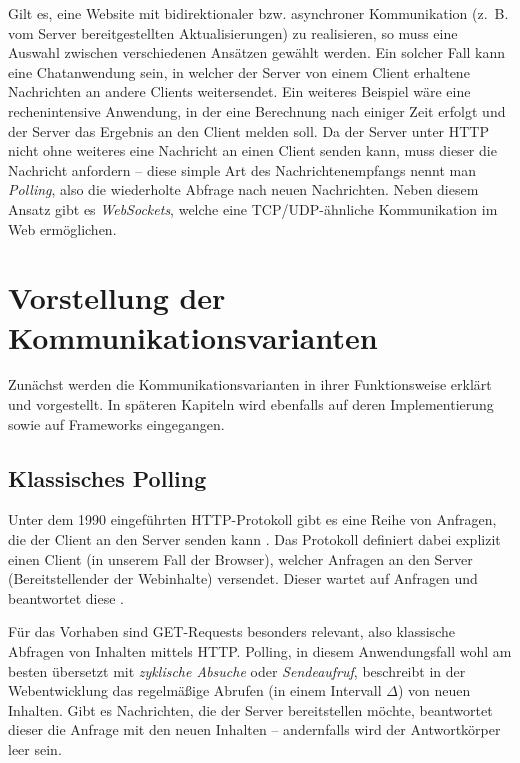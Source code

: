 \documentclass[sigplan, screen]{acmart}
\begin{document}
Gilt es, eine Website mit bidirektionaler bzw. asynchroner Kommunikation (z. B. vom Server bereitgestellten Aktualisierungen) zu realisieren,
so muss eine Auswahl zwischen verschiedenen Ansätzen gewählt werden. 
Ein solcher Fall kann eine Chatanwendung sein, in welcher der Server von einem Client erhaltene Nachrichten an andere Clients weitersendet.
Ein weiteres Beispiel wäre eine rechenintensive Anwendung,
in der eine Berechnung nach einiger Zeit erfolgt und der Server das Ergebnis an den Client melden soll.
Da der Server unter HTTP nicht ohne weiteres eine Nachricht an einen Client senden kann, muss dieser die Nachricht anfordern -- 
diese simple Art des Nachrichtenempfangs nennt man \emph{Polling}, also die wiederholte Abfrage nach neuen Nachrichten.
Neben diesem Ansatz gibt es \emph{WebSockets}, welche eine TCP/UDP-ähnliche Kommunikation im Web ermöglichen.

\section{Vorstellung der Kommunikationsvarianten}

Zunächst werden die Kommunikationsvarianten in ihrer Funktionsweise erklärt und vorgestellt.
In späteren Kapiteln wird ebenfalls auf deren Implementierung sowie auf Frameworks eingegangen.

\subsection{Klassisches Polling}

Unter dem 1990 eingeführten \cite[Abs. 1.2]{fielding_http_2022} HTTP-Protokoll gibt es eine Reihe von Anfragen, die der Client an den Server senden kann \cite{noauthor_http_nodate}.
Das Protokoll definiert dabei explizit einen Client (in unserem Fall der Browser), welcher Anfragen an den Server (Bereitstellender der Webinhalte) versendet.
Dieser wartet auf Anfragen und beantwortet diese \cite[Abs. 1.3]{fielding_http_2022}.

Für das Vorhaben sind GET-Requests besonders relevant, also klassische Abfragen von Inhalten mittels HTTP.
Polling, in diesem Anwendungsfall wohl am besten übersetzt mit \emph{zyklische Absuche} oder \emph{Sendeaufruf},
beschreibt in der Webentwicklung das regelmäßige Abrufen (in einem Intervall $\Delta$) von neuen Inhalten.
Gibt es Nachrichten, die der Server bereitstellen möchte, beantwortet dieser die Anfrage mit den neuen Inhalten --
andernfalls wird der Antwortkörper leer sein. 
\end{document}
